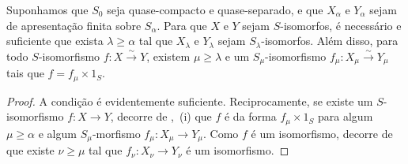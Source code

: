 \begin{corollary}[8.8.2.5]
\label{IV.8.8.2.5}
Suponhamos que $S_0$ seja quase-compacto e quase-separado, e que $X_\alpha$ e $Y_\alpha$ sejam de apresentação finita sobre $S_\alpha$.
Para que $X$ e $Y$ sejam $S$-isomorfos, é necessário e suficiente que exista $\lambda\geqslant\alpha$ tal que $X_\lambda$ e $Y_\lambda$ sejam $S_\lambda$-isomorfos. Além disso, para todo $S$-isomorfismo $f:X\xrightarrow{\sim}Y$, existem $\mu\geqslant\lambda$ e um $S_\mu$-isomorfismo $f_\mu:X_\mu\xrightarrow{\sim}Y_\mu$ tais que $f=f_\mu\times 1_S$.
\end{corollary}

\begin{proof}
A condição é evidentemente suficiente. Reciprocamente, se existe um $S$-isomorfismo $f:X\to Y$, decorre de ,~(i) que $f$ é da forma $f_\mu\times 1_S$ para algum $\mu\geqslant\alpha$ e algum $S_\mu$-morfismo $f_\mu:X_\mu\to Y_\mu$. Como $f$ é um isomorfismo, decorre de  que existe $\nu\geqslant\mu$ tal que $f_\nu:X_\nu\to Y_\nu$ é um isomorfismo.
\end{proof}

